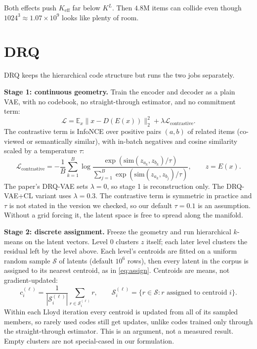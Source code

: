 \documentclass[11pt]{article}
\begin{document}
Both effects push $K_{\mathrm{eff}}$ far below $K^L$. Then $4.8$M items can
collide even though $1024^3 \approx 1.07 \times 10^9$ looks like plenty of room.

\section{DRQ}

DRQ keeps the hierarchical code structure but runs the two jobs separately.

\textbf{Stage 1: continuous geometry.} Train the encoder and decoder as a plain
VAE, with no codebook, no straight-through estimator, and no commitment term:
\begin{equation}
  \mathcal{L} = \mathbb{E}_{x} \bigl\| x - D(E(x)) \bigr\|_2^2
              + \lambda \mathcal{L}_{\text{contrastive}}.
  \label{eq:drq-stage1}
\end{equation}
The contrastive term is InfoNCE over positive pairs $(a, b)$ of related items
(co-viewed or semantically similar), with in-batch negatives and cosine
similarity scaled by a temperature $\tau$:
\begin{equation}
  \mathcal{L}_{\text{contrastive}} = -\frac{1}{B}\sum_{k=1}^{B}
    \log\frac{\exp(\mathrm{sim}(z_{a_k}, z_{b_k})/\tau)}
             {\sum_{j=1}^{B}\exp(\mathrm{sim}(z_{a_k}, z_{b_j})/\tau)},
  \qquad z = E(x).
  \label{eq:drq-infonce}
\end{equation}
The paper's DRQ-VAE sets $\lambda = 0$, so stage 1 is reconstruction only. The
DRQ-VAE+CL variant uses $\lambda = 0.3$. The contrastive term is symmetric in
practice and $\tau$ is not stated in the version we checked, so our default
$\tau = 0.1$ is an assumption.
Without a grid forcing it, the latent space is free to spread along the manifold.

\textbf{Stage 2: discrete assignment.} Freeze the geometry and run hierarchical
$k$-means on the latent vectors. Level $0$ clusters $z$ itself; each later level
clusters the residual left by the level above. Each level's centroids are fitted
on a uniform random sample $\mathcal{S}$ of latents (default $10^6$ rows), then
every latent in the corpus is assigned to its nearest centroid, as in
\eqref{eq:assign}. Centroids are means, not gradient-updated:
\begin{equation}
  c^{(\ell)}_i = \frac{1}{|\mathcal{S}^{(\ell)}_i|}
                 \sum_{r \in \mathcal{S}^{(\ell)}_i} r,
  \qquad
  \mathcal{S}^{(\ell)}_i = \bigl\{ r \in \mathcal{S} : r \text{ assigned to centroid } i \bigr\}.
  \label{eq:drq-mean}
\end{equation}
Within each Lloyd iteration every centroid is updated from all of its sampled
members, so rarely used codes still get updates, unlike codes trained only
through the straight-through estimator. This is an argument, not a measured
result. Empty clusters are not special-cased in our formulation.
\end{document}
